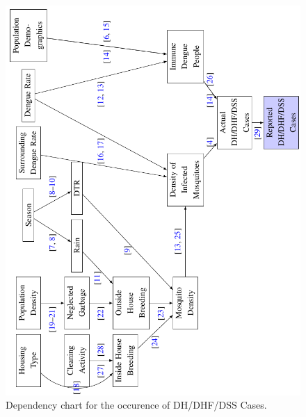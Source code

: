 \documentclass{bmcart}
\begin{document}

\begin{figure}[htb!]
	\centering
	\includegraphics{test}
	\caption{Dependency chart for the occurence of DH/DHF/DSS Cases. }
	\label{figure-bn}
\end{figure}
\end{document}
